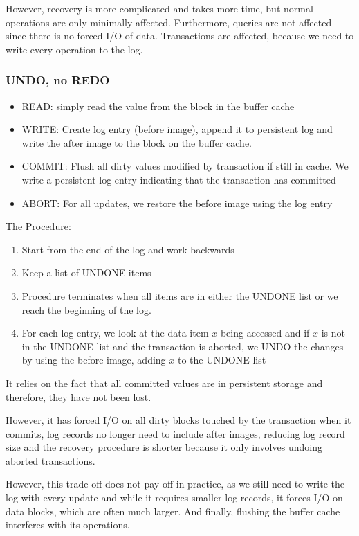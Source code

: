 However, recovery is more complicated and takes more time, but normal operations are only minimally affected.
Furthermore, queries are not affected since there is no forced I/O of data.
Transactions are affected, because we need to write every operation to the log.


\subsubsection{UNDO, no REDO}
\begin{itemize}
    \item READ: simply read the value from the block in the buffer cache
    \item WRITE: Create log entry (before image), append it to persistent log and write the after image to the block on the buffer cache.
    \item COMMIT: Flush all dirty values modified by transaction if still in cache. We write a persistent log entry indicating that the transaction has committed
    \item ABORT: For all updates, we restore the before image using the log entry
\end{itemize}
The Procedure:
\begin{enumerate}
    \item Start from the end of the log and work backwards
    \item Keep a list of UNDONE items
    \item Procedure terminates when all items are in either the UNDONE list or we reach the beginning of the log.
    \item For each log entry, we look at the data item $x$ being accessed and if $x$ is not in the UNDONE list and the transaction is aborted,
          we UNDO the changes by using the before image, adding $x$ to the UNDONE list
\end{enumerate}
It relies on the fact that all committed values are in persistent storage and therefore, they have not been lost.

However, it has forced I/O on all dirty blocks touched by the transaction when it commits,
log records no longer need to include after images, reducing log record size and the recovery procedure is shorter because it only involves undoing aborted transactions.

However, this trade-off does not pay off in practice, as we still need to write the log with every update and while it requires smaller log records,
it forces I/O on data blocks, which are often much larger.
And finally, flushing the buffer cache interferes with its operations.


